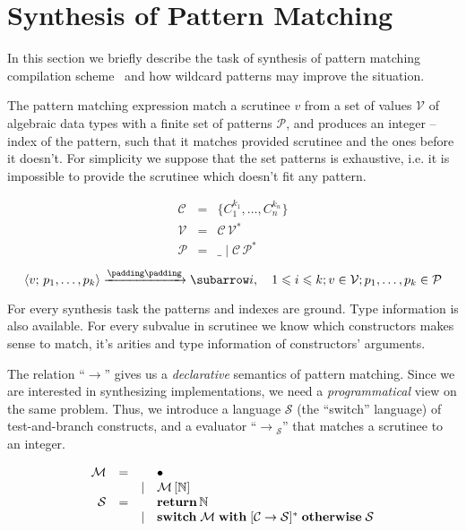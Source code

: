 
\section{Synthesis of Pattern Matching}
\label{sec:matching}

In this section we briefly describe the task of synthesis of pattern matching compilation scheme~\cite{Kosarev2020} and how wildcard patterns may improve the situation. 

The pattern matching expression match a scrutinee $v$ from a set of values $\mathcal{V}$ of algebraic data types with a finite set of patterns $\mathcal{P}$, and produces an integer -- index of the pattern, such that it matches provided scrutinee and the ones before it doesn't. For simplicity we suppose that the set patterns is exhaustive, i.e. it is impossible to provide the scrutinee which doesn't fit any pattern.

\[
 \begin{array}{rcll}
    \mathcal{C} & = & \{ C_1^{k_1}, \dots, C_n^{k_n} \}\\
    \mathcal{V} & = & \mathcal{C}\,\mathcal{V}^*\\  
    \mathcal{P} & = & \_ \mid \mathcal{C}\,\mathcal{P}^*
 \end{array}
\]
\[
\setarrow{\xrightarrow}
\trans{\inbr{v;\,p_1,\dots,p_k}}{}{i},\quad 1\leqslant i\leqslant k; v \in \mathcal{V}; p_1,\dots,p_k \in \mathcal{P}
\]

For every synthesis task the patterns and indexes are ground. Type information is also available. For every subvalue in scrutinee we know which constructors makes sense to match, it's arities and type information of constructors' arguments.

The relation ``$\xrightarrow{}{}\!\!$'' gives us a \emph{declarative} semantics of pattern matching. Since we are interested in
synthesizing implementations, we need a \emph{programmatical} view on the same problem. Thus, we introduce a language $\mathcal S$
(the ``switch'' language) of test-and-branch constructs, and a evaluator ``$\xrightarrow{}{}_{\!\!\mathcal S}$'' that matches a scrutinee to an integer.

\[
\begin{array}{rccl}
  \mathcal M & = &       & \bullet \\
             &   & \mid  & \mathcal M\,[\mathbb{N}] \\
  \mathcal{S}        & = &       & \mathbf{return}\,\mathbb{N} \\
             &   & \mid  & \mathbf{switch}\;\mathcal{M}\;\mathbf{with}\; [\mathcal{C}\; \mathbf{\rightarrow}\; \mathcal{S}]^*\;\mathbf{otherwise}\;\mathcal{S}
\end{array}
\]

